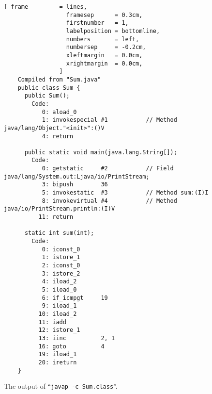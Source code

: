 \begin{figure}[!ht]
\centering
\begin{Verbatim}[ frame         = lines, 
                  framesep      = 0.3cm, 
                  firstnumber   = 1,
                  labelposition = bottomline,
                  numbers       = left,
                  numbersep     = -0.2cm,
                  xleftmargin   = 0.0cm,
                  xrightmargin  = 0.0cm,
                ]
    Compiled from "Sum.java"
    public class Sum {
      public Sum();
        Code:
           0: aload_0       
           1: invokespecial #1           // Method java/lang/Object."<init>":()V
           4: return        
    
      public static void main(java.lang.String[]);
        Code:
           0: getstatic     #2           // Field java/lang/System.out:Ljava/io/PrintStream;
           3: bipush        36
           5: invokestatic  #3           // Method sum:(I)I
           8: invokevirtual #4           // Method java/io/PrintStream.println:(I)V
          11: return        
    
      static int sum(int);
        Code:
           0: iconst_0      
           1: istore_1      
           2: iconst_0      
           3: istore_2      
           4: iload_2       
           5: iload_0       
           6: if_icmpgt     19
           9: iload_1       
          10: iload_2       
          11: iadd          
          12: istore_1      
          13: iinc          2, 1
          16: goto          4
          19: iload_1       
          20: ireturn       
    }
\end{Verbatim}
\vspace*{-0.3cm}
\caption{The output of ``\texttt{javap -c Sum.class}''.}
\label{fig:Sum.class}
\end{figure}


